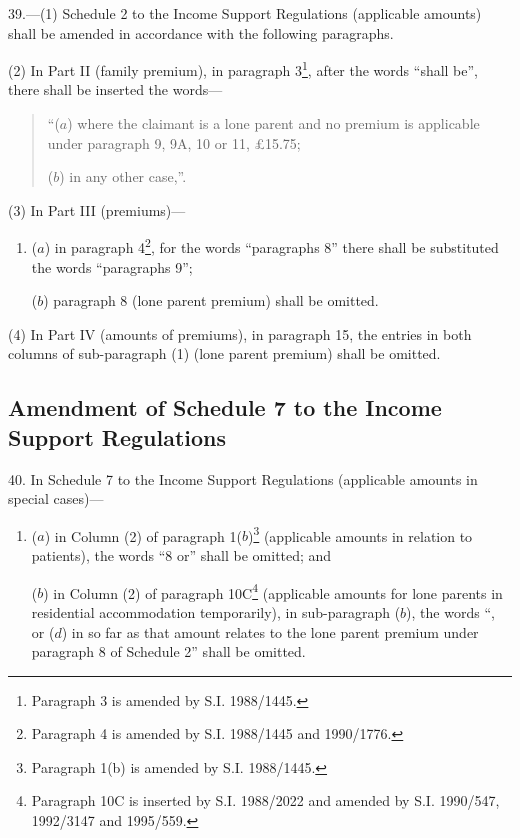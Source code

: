 \documentclass[a4paper]{article}
\begin{document}
39.—(1) Schedule 2 to the Income Support Regulations (applicable amounts) shall be amended in accordance with the following paragraphs.

(2) In Part II (family premium), in paragraph 3\footnote{\frenchspacing Paragraph 3 is amended by S.I. 1988/1445.}, after the words “shall be”, there shall be inserted the words—
\begin{quotation}
“($a$) where the claimant is a lone parent and no premium is applicable under paragraph 9, 9A, 10 or 11, £15.75;

($b$) in any other case,”.
\end{quotation}

(3) In Part III (premiums)—
\begin{enumerate}\item[]
($a$) in paragraph 4\footnote{\frenchspacing Paragraph 4 is amended by S.I. 1988/1445 and 1990/1776.}, for the words “paragraphs 8” there shall be substituted the words “paragraphs 9”;

($b$) paragraph 8 (lone parent premium) shall be omitted.
\end{enumerate}

(4) In Part IV (amounts of premiums), in paragraph 15, the entries in both columns of sub-paragraph (1) (lone parent premium) shall be omitted.

\subsection[40. Amendment of Schedule 7 to the Income Support Regulations]{Amendment of Schedule 7 to the Income Support Regulations}

40.  In Schedule 7 to the Income Support Regulations (applicable amounts in special cases)—
\begin{enumerate}\item[]
($a$) in Column (2) of paragraph 1($b$)\footnote{\frenchspacing Paragraph 1(b) is amended by S.I. 1988/1445.} (applicable amounts in relation to patients), the words “8 or” shall be omitted; and

($b$) in Column (2) of paragraph 10C\footnote{\frenchspacing Paragraph 10C is inserted by S.I. 1988/2022 and amended by S.I. 1990/547, 1992/3147 and 1995/559.} (applicable amounts for lone parents in residential accommodation temporarily), in sub-paragraph ($b$), the words “, or ($d$) in so far as that amount relates to the lone parent premium under paragraph 8 of Schedule 2” shall be omitted.
\end{enumerate}
\end{document}
